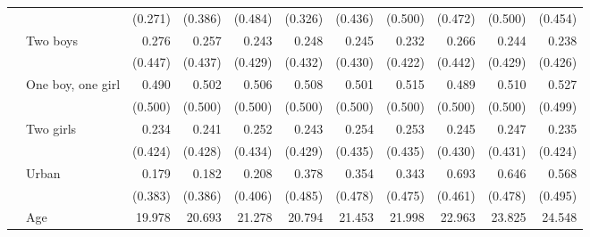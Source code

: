 \begin{table}
\begin{center}
\begin{scriptsize}
\begin{threeparttable}
\begin{tabular} {@{} c l D{.}{.}{1.3} D{.}{.}{1.3} D{.}{.}{1.3} D{.}{.}{1.3} D{.}{.}{1.3} D{.}{.}{1.3} D{.}{.}{1.3} D{.}{.}{1.3} D{.}{.}{1.3} @{}}
                    &                     &     (0.271)         &     (0.386)         &     (0.484)         &     (0.326)         &     (0.436)         &     (0.500)         &     (0.472)         &     (0.500)         &     (0.454)         \\
                    & Two boys            &       0.276         &       0.257         &       0.243         &       0.248         &       0.245         &       0.232         &       0.266         &       0.244         &       0.238         \\
                    &                     &     (0.447)         &     (0.437)         &     (0.429)         &     (0.432)         &     (0.430)         &     (0.422)         &     (0.442)         &     (0.429)         &     (0.426)         \\
                    & One boy, one girl   &       0.490         &       0.502         &       0.506         &       0.508         &       0.501         &       0.515         &       0.489         &       0.510         &       0.527         \\
                    &                     &     (0.500)         &     (0.500)         &     (0.500)         &     (0.500)         &     (0.500)         &     (0.500)         &     (0.500)         &     (0.500)         &     (0.499)         \\
                    & Two girls           &       0.234         &       0.241         &       0.252         &       0.243         &       0.254         &       0.253         &       0.245         &       0.247         &       0.235         \\
                    &                     &     (0.424)         &     (0.428)         &     (0.434)         &     (0.429)         &     (0.435)         &     (0.435)         &     (0.430)         &     (0.431)         &     (0.424)         \\
                    & Urban               &       0.179         &       0.182         &       0.208         &       0.378         &       0.354         &       0.343         &       0.693         &       0.646         &       0.568         \\
                    &                     &     (0.383)         &     (0.386)         &     (0.406)         &     (0.485)         &     (0.478)         &     (0.475)         &     (0.461)         &     (0.478)         &     (0.495)         \\
                    & Age                 &      19.978         &      20.693         &      21.278         &      20.794         &      21.453         &      21.998         &      22.963         &      23.825         &      24.548         \\

\end{tabular}
\end{threeparttable}
\end{scriptsize}
\end{center}
\end{table}
